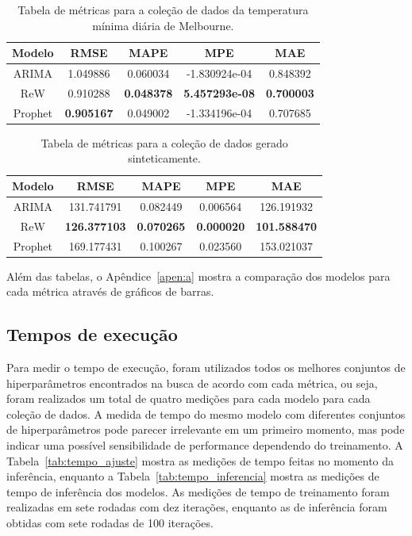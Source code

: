 \begin{table}[!htp]
    \caption{Tabela de métricas para a coleção de dados da temperatura mínima diária de Melbourne.}\label{tab:temperature_results}
    \centering
    \begin{tabular}{@{}ccccc@{}} \toprule
        Modelo  & RMSE              & MAPE              & MPE                   & MAE               \\ \midrule
        ARIMA   & 1.049886          & 0.060034          & -1.830924e-04         & 0.848392          \\
        ReW     & 0.910288          & \textbf{0.048378} & \textbf{5.457293e-08} & \textbf{0.700003} \\
        Prophet & \textbf{0.905167} & 0.049002          & -1.334196e-04         & 0.707685          \\ \bottomrule
    \end{tabular}
\end{table}

\begin{table}[!htp]
    \caption{Tabela de métricas para a coleção de dados gerado sinteticamente.}\label{tab:synthetic_results}
    \centering
    \begin{tabular}{@{}ccccc@{}} \toprule
        Modelo  & RMSE                & MAPE              & MPE               & MAE                 \\ \midrule
        ARIMA   & 131.741791          & 0.082449          & 0.006564          & 126.191932          \\
        ReW     & \textbf{126.377103} & \textbf{0.070265} & \textbf{0.000020} & \textbf{101.588470} \\
        Prophet & 169.177431          & 0.100267          & 0.023560          & 153.021037          \\ \bottomrule
    \end{tabular}
\end{table}

Além das tabelas, o Apêndice~\ref{apen:a} mostra a comparação dos modelos para cada métrica através de gráficos de barras.


\subsection{Tempos de execução}
Para medir o tempo de execução, foram utilizados todos os melhores conjuntos de hiperparâmetros encontrados na busca de acordo com cada métrica, ou seja, foram realizados um total de quatro medições para cada modelo para cada coleção de dados. A medida de tempo do mesmo modelo com diferentes conjuntos de hiperparâmetros pode parecer irrelevante em um primeiro momento, mas pode indicar uma possível sensibilidade de performance dependendo do treinamento. A Tabela~\ref{tab:tempo_ajuste} mostra as medições de tempo feitas no momento da inferência, enquanto a Tabela~\ref{tab:tempo_inferencia} mostra as medições de tempo de inferência dos modelos. As medições de tempo de treinamento foram realizadas em sete rodadas com dez iterações, enquanto as de inferência foram obtidas com sete rodadas de 100 iterações.

